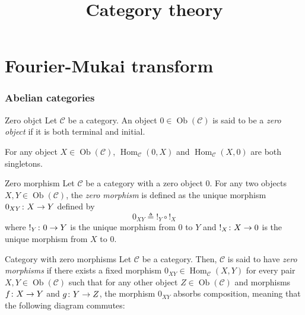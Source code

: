 \documentclass[a4paper]{article}
\title{Category theory}
\author{}
\date{}
\begin{document}
\maketitle
\tableofcontents

\pagebreak

\part{Fourier-Mukai transform}

\section{Abelian categories}

\begin{snippetdefinition}{Zero objct}
    Let \(\mathcal C\) be a category.
    An object \(0 \in \operatorname{Ob}(\mathcal C)\) is said to be a \emph{zero object}
    if it is both terminal and initial.
\end{snippetdefinition}

For any object \(X \in \operatorname{Ob}(\mathcal C)\),
\(\operatorname{Hom}_{\mathcal C}(0, X)\) and
\(\operatorname{Hom}_{\mathcal C}(X, 0)\) are both singletons.

\begin{snippetdefinition}{Zero morphism}
    Let \(\mathcal C\) be a category with a zero object \(0\).
    For any two objects \(X,Y \in \operatorname{Ob}(\mathcal C)\), the \emph{zero morphism}
    is defined as the unique morphism \(0_{XY} \colon X \to Y\) defined by
    \[
        0_{XY} \triangleq !_Y \circ !_X
    \]
    where \(!_Y \colon 0 \to Y\) is the unique morphism
    from \(0\) to \(Y\) and \(!_X \colon X \to 0\) is the unique morphism
    from \(X\) to \(0\).
\end{snippetdefinition}

\begin{snippetdefinition}{Category with zero morphisms}
    Let \(\mathcal C\) be a category.
    Then, \(\mathcal C\) is said to have \emph{zero morphisms} if there exists
    a fixed morphism \(0_{XY} \in \operatorname{Hom}_{\mathcal C}(X, Y)\) for every
    pair \(X,Y \in \operatorname{Ob}(\mathcal C)\) such that for any other
    object \(Z \in \operatorname{Ob}(\mathcal C)\) and morphisms \(f \colon X \to Y\) and \(g \colon Y \to Z\),
    the morphism \(0_{XY}\) absorbs composition, meaning that the following diagram commutes:
    \begin{center}
    \end{center}
\end{snippetdefinition}
\end{document}
